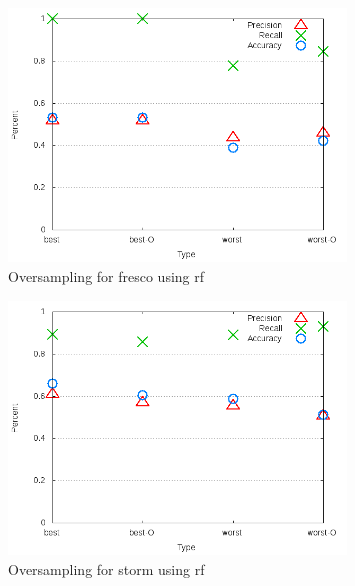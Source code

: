 
\begin{figure}[!ht]
    \centering
        \includegraphics[width=0.8\textwidth]{images/rf/test_4/fresco_sample_range}
        \caption{Oversampling for fresco using \gls{rf}}
        \label{fig:test_4_fresco_rf}
\end{figure}

\begin{figure}[!ht]
    \centering
        \includegraphics[width=0.8\textwidth]{images/rf/test_4/storm_sample_range}
        \caption{Oversampling for storm using \gls{rf}}
        \label{fig:test_4_storm_rf}
\end{figure}

